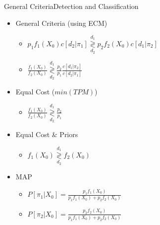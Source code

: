 \documentclass[aspectratio=169,10pt,t]{beamer}
\newcommand\gldec[2]{
	\underset{#2}{\overset{#1}{\gtrless}}
}
\begin{document}
\begin{frame}{General Criteria}{Detection and Classification}
	\begin{itemize}
        \item General Criteria (using ECM)
        \begin{itemize}
					\item $ p_1 f_1(X_0) c[d_2 | \pi_1] \gldec{d_1}{d_2} p_2 f_2(X_0) c[d_1 | \pi_2]$
            \item $ \frac{f_1(X_0)}{f_2(X_0)} \gldec{d_1}{d_2} \frac{p_2}{p_1} \frac{c[d_1 | \pi_2]}{c[d_2 | \pi_1]}$
        \end{itemize}
				\pause
        \item Equal Cost ($min(TPM)$)
        \begin{itemize}
            \item $ \frac{f_1(X_0)}{f_2(X_0)}  \gldec{d_1}{d_2} \frac{p_2}{p_1}$
        \end{itemize}
				\pause
        \item Equal Cost \& Priors
        \begin{itemize}
            \item $ f_1(X_0)  \gldec{d_1}{d_2} f_2(X_0)$
        \end{itemize}
				\pause
        \item MAP
        \begin{itemize}
            \item $P[\pi_1 | X_0 ] = \frac{p_1 f_1(X_0)}{p_1 f_1(X_0) + p_2 f_2(X_0)}$
            \item $P[\pi_2 | X_0 ] = \frac{p_2 f_2(X_0)}{p_1 f_1(X_0) + p_2 f_2(X_0)}$
        \end{itemize}
			\end{itemize}
\end{frame}
\end{document}
